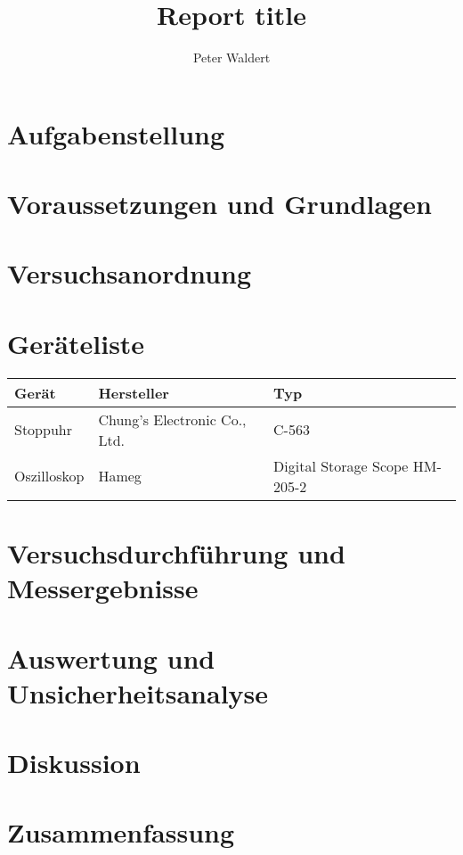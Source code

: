 \documentclass{report}
\title{Report title}
\author{Peter Waldert}
\date{}
\begin{document}
    \maketitle

    \tableofcontents
    \newpage

    \section{Aufgabenstellung}

    \section{Voraussetzungen und Grundlagen}

    \section{Versuchsanordnung}

    \section{Geräteliste}
    \begin{tabular}{|l|l|l|}
        \hline
        \textbf{Gerät} & \textbf{Hersteller}          & \textbf{Typ}                   \\
        \hline
        Stoppuhr         & Chung's Electronic Co., Ltd. & C-563                          \\ \hline
        Oszilloskop      & Hameg                        & Digital Storage Scope HM-205-2 \\ \hline
    \end{tabular}

    \section{Versuchsdurchführung und Messergebnisse}

    \section{Auswertung und Unsicherheitsanalyse}

    \section{Diskussion}

    \section{Zusammenfassung}

    \newpage
    \listoftables
    \listoffigures
\end{document}

